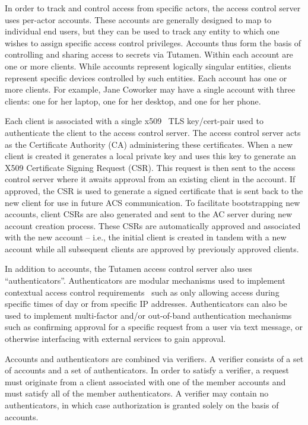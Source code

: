In order to track and control access from specific actors, the access
control server uses per-actor accounts. These accounts are generally
designed to map to individual end users, but they can be used to track
any entity to which one wishes to assign specific access control
privileges. Accounts thus form the basis of controlling and sharing
access to secrets via Tutamen. Within each account are one or more
clients. While accounts represent logically singular entities, clients
represent specific devices controlled by such entities. Each account
has one or more clients. For example, Jane Coworker may have a single
account with three clients: one for her laptop, one for her desktop,
and one for her phone.

Each client is associated with a single x509~\cite{rfc5280} TLS
key/cert-pair used to authenticate the client to the access control
server. The access control server acts as the Certificate Authority
(CA) administering these certificates. When a new client is created it
generates a local private key and uses this key to generate an X509
Certificate Signing Request (CSR). This request is then sent to the
access control server where it awaits approval from an existing client
in the account. If approved, the CSR is used to generate a signed
certificate that is sent back to the new client for use in future ACS
communication. To facilitate bootstrapping new accounts, client CSRs
are also generated and sent to the AC server during new account
creation process. These CSRs are automatically approved and associated
with the new account -- i.e., the initial client is created in tandem
with a new account while all subsequent clients are approved by
previously approved clients.

In addition to accounts, the Tutamen access control server also uses
``authenticators''. Authenticators are modular mechanisms used to
implement contextual access control requirements~\cite{hulsebosch2005}
such as only allowing access during specific times of day or from
specific IP addresses. Authenticators can also be used to implement
multi-factor and/or out-of-band authentication mechanisms such as
confirming approval for a specific request from a user via text
message, or otherwise interfacing with external services to gain
approval.

Accounts and authenticators are combined via verifiers. A verifier
consists of a set of accounts and a set of authenticators. In order to
satisfy a verifier, a request must originate from a client associated
with one of the member accounts and must satisfy all of the member
authenticators. A verifier may contain no authenticators, in which
case authorization is granted solely on the basis of accounts.

